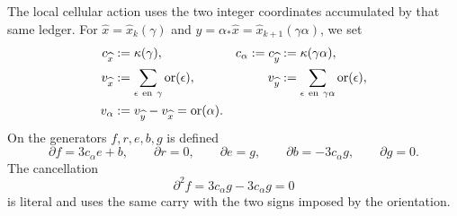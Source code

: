 The local cellular action uses the two integer coordinates accumulated by that
same ledger. For
\(\widehat x=\widehat x_k(\gamma)\) and
\(\widehat y=\alpha_*\widehat x=\widehat x_{k+1}(\gamma\alpha)\), we set
\begin{equation}
\label{eq:pdfv2-cor-c-v}
 \begin{aligned}
 c_{\widehat x}&:=\kappa(\gamma), &
 c_\alpha:=c_{\widehat y}&:=\kappa(\gamma\alpha),\\
 v_{\widehat x}&:=\sum_{\epsilon\ {\rm en}\ \gamma}
                  \operatorname{or}(\epsilon), &
 v_{\widehat y}&:=\sum_{\epsilon\ {\rm en}\ \gamma\alpha}
                  \operatorname{or}(\epsilon),\\
 v_\alpha&:=v_{\widehat y}-v_{\widehat x}
           =\operatorname{or}(\alpha).&&
 \end{aligned}
\end{equation}
On the generators \(f,r,e,b,g\) is defined
\begin{equation}
\label{eq:pdfv2-cor-complejo-local}
 \partial f=3c_\alpha e+b,\qquad
 \partial r=0,\qquad
 \partial e=g,\qquad
 \partial b=-3c_\alpha g,\qquad
 \partial g=0.
\end{equation}
The cancellation
\begin{equation}
\label{eq:pdfv2-cor-dos-cero}
 \partial^2f=3c_\alpha g-3c_\alpha g=0
\end{equation}
is literal and uses the same carry with the two signs imposed by the
orientation.

